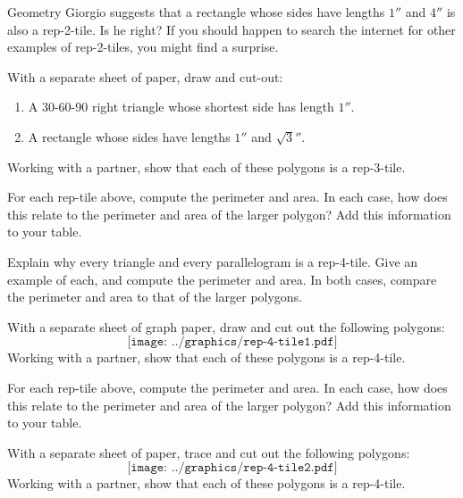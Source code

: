 \begin{prob}
Geometry Giorgio suggests that a rectangle whose sides have lengths
$1''$ and $4''$ is also a rep-2-tile. Is he right? If you should
happen to search the internet for other examples of rep-2-tiles, you
might find a surprise.
\end{prob}


\begin{prob}
With a separate sheet of paper, draw and cut-out:
\begin{enumerate}
\item A 30-60-90 right triangle whose shortest side has length $1''$.
\item A rectangle whose sides have lengths $1''$ and $\sqrt{3}''$.
\end{enumerate}
Working with a partner, show that each of these polygons is a rep-3-tile.
\end{prob}

\begin{prob}
For each rep-tile above, compute the perimeter and area. In each case,
how does this relate to the perimeter and area of the larger polygon?
Add this information to your table.
\end{prob}


\begin{prob}
Explain why every triangle and every parallelogram is a
rep-4-tile. Give an example of each, and compute the perimeter and
area. In both cases, compare the perimeter and area to that of the
larger polygons.
\end{prob}



\begin{prob}
With a separate sheet of graph paper, draw and cut out the following polygons:
\[
\texttt{[image: ../graphics/rep-4-tile1.pdf]}
\]
Working with a partner, show that each of these polygons is a rep-4-tile.
\end{prob}

\begin{prob}
For each rep-tile above, compute the perimeter and area. In each case,
how does this relate to the perimeter and area of the larger polygon?
Add this information to your table.
\end{prob}


\begin{prob}
With a separate sheet of paper, trace and cut out the following
polygons:
\[
\texttt{[image: ../graphics/rep-4-tile2.pdf]}
\]
Working with a partner, show that each of these polygons is a rep-4-tile.
\end{prob}


